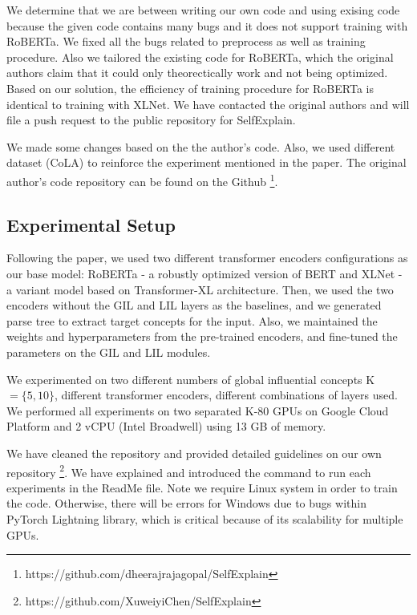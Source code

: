 \documentclass{article}
\begin{document}
We determine that we are between writing our own code and using exising code because the given 
code contains many bugs and it does not support training with RoBERTa. We fixed all the bugs related 
to preprocess as well as training procedure. Also we tailored the existing code for RoBERTa, which the 
original authors claim that it could only theorectically work and not being optimized. Based on our 
solution, the efficiency of training procedure for RoBERTa is identical to training with XLNet. We have 
contacted the original authors and will file a push request to the public repository for SelfExplain.

We made some changes based on the the author's code. Also, we used different dataset (CoLA) to 
reinforce the experiment mentioned in the paper. The original author's code repository can be found on 
the Github \footnote{https://github.com/dheerajrajagopal/SelfExplain}.

\subsection{Experimental Setup}

Following the paper, we used two different transformer encoders configurations as our base model:
 RoBERTa \cite{DBLP:journals/corr/abs-1907-11692} - a robustly optimized version of BERT and XLNet \cite{DBLP:journals/corr/abs-1906-08237} - 
 a variant model based on Transformer-XL architecture. Then, we used the two encoders without the GIL 
 and LIL layers as the baselines, and we generated parse tree to extract target concepts for the input. 
 Also, we maintained the weights and hyperparameters from the pre-trained encoders, and fine-tuned the 
 parameters on the GIL and LIL modules. 

We experimented on two different numbers of global
influential concepts K $= \{5, 10\}$, different transformer encoders, different combinations of layers
 used. We performed all experiments on two separated K-80 GPUs on Google Cloud Platform and 
 2 vCPU (Intel Broadwell) using 13 GB of memory.

We have cleaned the repository and provided detailed guidelines 
on our own repository \footnote{https://github.com/XuweiyiChen/SelfExplain}. We have explained 
and introduced the command to run each experiments in the ReadMe file. Note we require Linux 
system in order to train the code. Otherwise, there will be errors for Windows due to bugs within 
PyTorch Lightning library, which is critical because of its scalability for multiple GPUs.
\end{document}
